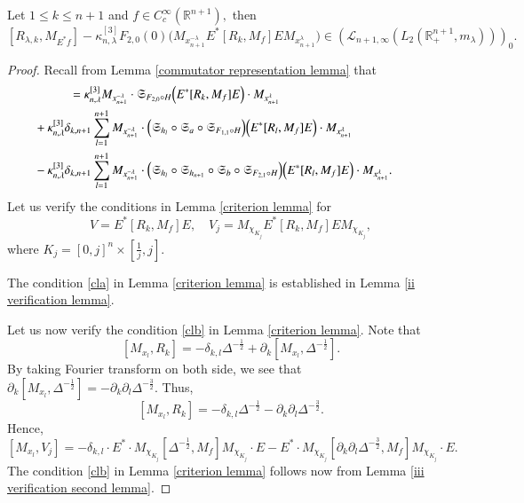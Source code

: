 \documentclass{amsart}
\begin{document}
\begin{lemma}\label{first approximate lemma} Let $1\leq k\leq n+1$ and $f\in C^{\infty}_c(\mathbb{R}^{n+1}),$ then
$$[R_{\lambda,k},M_{E^{\ast}f}]-\kappa_{n,\lambda}^{[3]}F_{2,0}(0)\Big( M_{x_{n+1}^{-\lambda}} E^{\ast}[R_k,M_f]E M_{x_{n+1}^{\lambda}}\Big)\in (\mathcal{L}_{n+1,\infty}(L_2(\mathbb{R}^{n+1}_+,m_{\lambda})))_0.$$
\end{lemma}
\begin{proof} Recall from Lemma \ref{commutator representation lemma} that
\begin{align*}
[R_{\lambda,k},M_{E^{\ast}f}]&=\kappa_{n,\lambda}^{[3]}M_{x_{n+1}^{-\lambda}}\cdot\mathfrak{S}_{F_{2,0}\circ H}\Big(  E^{\ast}[R_k,M_{f}]E\Big)\cdot  M_{x_{n+1}^{\lambda}}\\
&\hspace{-1.0cm}+\kappa_{n,\lambda}^{[3]}\delta_{k,n+1}\sum_{l=1}^{n+1}M_{x_{n+1}^{-\lambda}} \cdot \Big(\mathfrak{S}_{h_l}\circ\mathfrak{S}_a\circ\mathfrak{S}_{F_{1,1}\circ H}\Big)\Big(E^{\ast}[R_l,M_{f}]E \Big)\cdot M_{x_{n+1}^{\lambda}}\\
&\hspace{-1.0cm}-\kappa_{n,\lambda}^{[3]}\delta_{k,n+1}\sum_{l=1}^{n+1} M_{x_{n+1}^{-\lambda}}\cdot\Big(\mathfrak{S}_{h_l}\circ\mathfrak{S}_{h_{n+1}}\circ\mathfrak{S}_b\circ\mathfrak{S}_{F_{2,1}\circ H}\Big)\Big( E^{\ast}[R_l,M_{f}]E\Big)\cdot  M_{x_{n+1}^{\lambda}}.
\end{align*}
Let us verify the conditions in Lemma \ref{criterion lemma} for
$$V=E^{\ast}[R_k,M_f]E,\quad V_j=M_{\chi_{K_j}}E^{\ast}[R_k,M_f]EM_{\chi_{K_j}},$$
where $K_j=[0,j]^n\times[\frac1j,j].$

The condition \eqref{cla} in Lemma \ref{criterion lemma} is established in Lemma \ref{ii verification lemma}.

Let us now verify the condition \eqref{clb} in Lemma \ref{criterion lemma}. Note that
$$[M_{x_l},R_k]=-\delta_{k,l}\Delta^{-\frac12}+\partial_k[M_{x_l},\Delta^{-\frac12}].$$
By taking Fourier transform on both side, we see that $\partial_k[M_{x_l},\Delta^{-\frac12}]=-\partial_k\partial_l\Delta^{-\frac32}.$ Thus,
$$[M_{x_l},R_k]=-\delta_{k,l}\Delta^{-\frac12}-\partial_k\partial_l\Delta^{-\frac32}.$$
Hence,
$$[M_{x_l},V_j]=-\delta_{k,l}\cdot E^{\ast}\cdot M_{\chi_{K_j}}[\Delta^{-\frac12},M_f]M_{\chi_{K_j}}\cdot E-E^{\ast}\cdot M_{\chi_{K_j}}[\partial_k\partial_l\Delta^{-\frac32},M_f]M_{\chi_{K_j}}\cdot E.$$
The condition \eqref{clb} in Lemma \ref{criterion lemma} follows now from Lemma \ref{iii verification second lemma}.


\end{proof}
\end{document}
